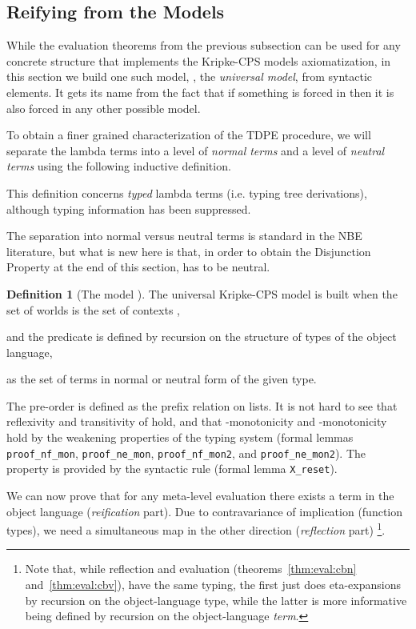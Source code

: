 \documentclass{eptcs}
\theoremstyle{definition}
\newtheorem{definition}{Definition}[section]
\theoremstyle{plain}
\theoremstyle{remark}
\begin{document}
\subsection{Reifying from the Models}\label{subsec:completeness}

While the evaluation theorems from the previous subsection can be used for any concrete structure that implements the Kripke-CPS models axiomatization, in this section we build one such model, , the \emph{universal model}, from syntactic elements. It gets its name from the fact that if something is forced in  then it is also forced in any other possible model.

To obtain a finer grained characterization of the TDPE procedure, we will separate the lambda terms into a level of \emph{normal terms} and a level of \emph{neutral terms} using the following inductive definition.

This definition concerns \emph{typed} lambda terms (i.e. typing tree derivations), although typing information has been suppressed.

The separation into normal versus neutral terms is standard in the NBE literature, but what is new here is that, in order to obtain the Disjunction Property at the end of this section,  has to be neutral.

\begin{definition}[The model ] The universal Kripke-CPS model  is built when the set of worlds is the set of contexts ,

and the predicate  is defined by recursion on the structure of types of the object language,

as the set of terms in normal or neutral form of the given type.

The pre-order  is defined as the prefix relation on lists. It is not hard to see that reflexivity and transitivity of  hold, and that -monotonicity and -monotonicity hold by the weakening properties of the typing system (formal lemmas \texttt{proof\_nf\_mon}, \texttt{proof\_ne\_mon}, \texttt{proof\_nf\_mon2}, and \texttt{proof\_ne\_mon2}). The property  is provided by the syntactic  rule (formal lemma \texttt{X\_reset}).
\end{definition}

We can now prove that for any meta-level evaluation there exists a term in the object language (\emph{reification} part). Due to contravariance of implication (function types), we need a simultaneous map in the other direction (\emph{reflection} part) \footnote{Note that, while reflection and evaluation (theorems~\ref{thm:eval:cbn} and~\ref{thm:eval:cbv}), have the same typing, the first just does eta-expansions by recursion on the object-language type, while the latter is more informative being defined by recursion on the object-language \emph{term}. }.
\end{document}
